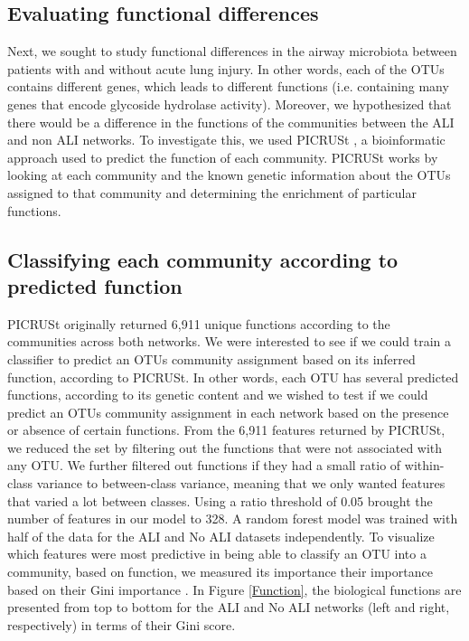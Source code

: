 \subsection{Evaluating functional differences}
\indent Next, we sought to study functional differences in the airway microbiota between patients with and without acute lung injury. In other words, each of the OTUs contains different genes, which leads to different functions (i.e. containing many genes that encode glycoside hydrolase activity). Moreover, we hypothesized that there would be a difference in the functions of the communities between the ALI and non ALI networks. To investigate this, we used PICRUSt \cite{picrust}, a bioinformatic approach used to predict the function of each community. PICRUSt works by looking at each community and the known genetic information about the OTUs assigned to that community and determining the enrichment of particular functions. 

\subsection{Classifying each community according to predicted function}
\indent PICRUSt originally returned 6,911 unique functions according to the communities across both networks. We were interested to see if we could train a classifier to predict an OTUs community assignment based on its inferred function, according to PICRUSt. In other words, each OTU has several predicted functions, according to its genetic content and we wished to test if we could predict an OTUs community assignment in each network based on the presence or absence of certain functions. From the 6,911 features returned by PICRUSt, we reduced the set by filtering out the functions that were not associated with any OTU. We further filtered out functions if they had a small ratio of within-class variance to between-class variance, meaning that we only wanted features that varied a lot between classes. Using a ratio threshold of 0.05 brought the number of features in our model to 328. A random forest model was trained with half of the data for the ALI and No ALI datasets independently.  To visualize which features were most predictive in being able to classify an OTU into a community, based on function, we measured its importance their importance based on their Gini importance \cite{gini}. In Figure \ref{Function}, the biological functions are presented from top to bottom for the ALI and No ALI networks (left and right, respectively) in terms of their Gini score.

